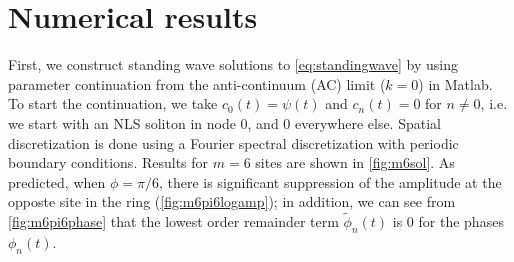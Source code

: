 \documentclass[11pt,reqno]{amsart}
\begin{document}
\section{Numerical results}\label{sec:numerics}

First, we construct standing wave solutions to \cref{eq:standingwave} by using parameter continuation from the anti-continuum (AC) limit ($k=0$) in Matlab. To start the continuation, we take $c_0(t) = \psi(t)$ and $c_n(t) = 0$ for $n \neq 0$, i.e. we start with an NLS soliton in node 0, and 0 everywhere else. Spatial discretization is done using a Fourier spectral discretization with periodic boundary conditions. Results for $m=6$ sites are shown in \cref{fig:m6sol}. As predicted, when $\phi=\pi/6$, there is significant suppression of the amplitude at the opposte site in the ring (\cref{fig:m6pi6logamp}); in addition, we can see from \cref{fig:m6pi6phase} that the lowest order remainder term $\tilde{\phi}_n(t)$ is 0 for the phases $\phi_n(t)$.
\end{document}

